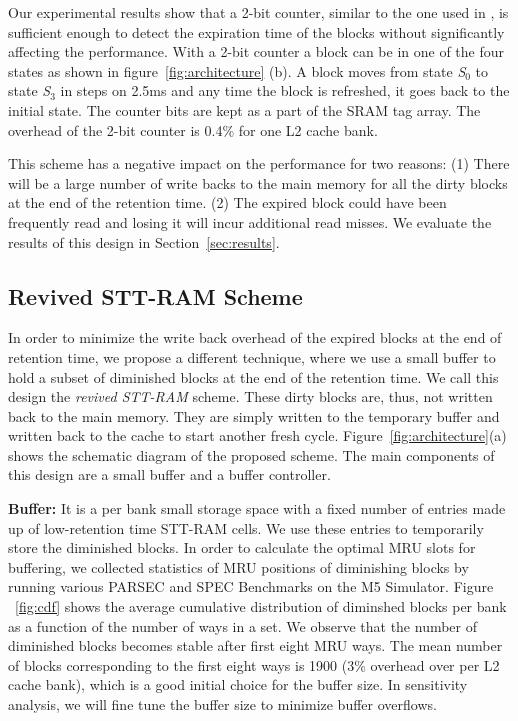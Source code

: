 Our experimental results show that a 2-bit counter, similar to the one used in \cite{cache-decay-2001},
is sufficient enough to detect the expiration time of the blocks without significantly affecting the performance.
With a 2-bit counter a block can be in one of the four states as shown in figure~\ref{fig:architecture} (b).
A block moves from state {\it S$_0$} to state {\it S$_3$} in steps on 2.5ms and any time the block is refreshed, it
goes back to the initial state.  The counter bits are kept as a part of the SRAM tag array.
The overhead of the 2-bit counter is 0.4\% for one L2 cache bank.

This scheme has a negative impact on the performance for two reasons: (1) There will be  a large number of write
backs to the main memory for all the dirty blocks at the end of the retention time.
(2) The expired block could have been frequently read and losing it will incur additional read misses.
We evaluate the results of this design in Section~\ref{sec:results}.


\subsection{{Revived STT-RAM Scheme}}
In order to minimize the write back overhead of the expired blocks at the end of retention time, we propose
a different technique, where we use a small buffer to hold a subset of diminished blocks at the end of the retention
time. We call this design the {\it revived STT-RAM} scheme. These dirty blocks are, thus, not written back to the main memory. They are simply written to the temporary buffer and
written back to the cache to start another fresh cycle.
Figure~\ref{fig:architecture}(a) shows the schematic diagram of the proposed scheme.
The main components of this design are a small buffer and a buffer controller.

\noindent\textbf{Buffer:}
It is a per bank small storage space with a fixed number of entries made up of low-retention time STT-RAM cells.
We use these entries to temporarily store the diminished blocks. In order to calculate the optimal MRU slots for buffering,
we collected statistics of MRU positions of diminishing blocks by running various PARSEC and SPEC Benchmarks on the M5 Simulator.
Figure ~\ref{fig:cdf} shows the average cumulative distribution of diminshed blocks per bank
as a function of the number of ways in a set. We observe that the number of diminished blocks becomes stable
after first eight MRU ways. The mean number of blocks corresponding to the first eight ways is 1900
(3\% overhead over per L2 cache bank),
which is a good initial choice for the buffer size. In sensitivity analysis, we will fine tune the buffer size
to minimize buffer overflows.

